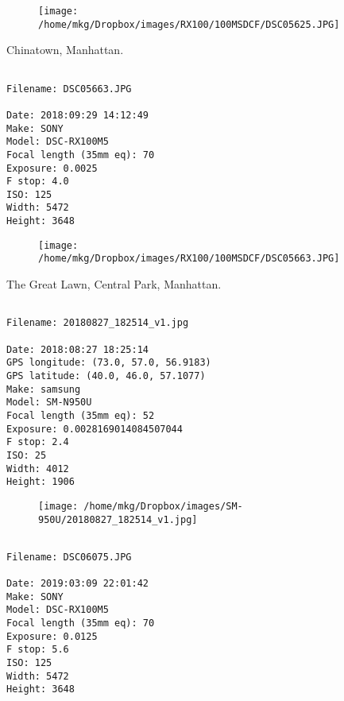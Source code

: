 \begin{figure}
\texttt{[image: /home/mkg/Dropbox/images/RX100/100MSDCF/DSC05625.JPG]}
\end{figure}
    
\clearpage
\onecolumn
\noindent Chinatown, Manhattan.
\noindent
\begin{lstlisting}

Filename: DSC05663.JPG

Date: 2018:09:29 14:12:49
Make: SONY
Model: DSC-RX100M5
Focal length (35mm eq): 70
Exposure: 0.0025
F stop: 4.0
ISO: 125
Width: 5472
Height: 3648
\end{lstlisting}
\clearpage

\begin{figure}
\texttt{[image: /home/mkg/Dropbox/images/RX100/100MSDCF/DSC05663.JPG]}
\end{figure}
    
\clearpage
\onecolumn
\noindent The Great Lawn, Central Park, Manhattan.
\noindent
\begin{lstlisting}

Filename: 20180827_182514_v1.jpg

Date: 2018:08:27 18:25:14
GPS longitude: (73.0, 57.0, 56.9183)
GPS latitude: (40.0, 46.0, 57.1077)
Make: samsung
Model: SM-N950U
Focal length (35mm eq): 52
Exposure: 0.0028169014084507044
F stop: 2.4
ISO: 25
Width: 4012
Height: 1906
\end{lstlisting}
\clearpage

\begin{figure}
\texttt{[image: /home/mkg/Dropbox/images/SM-950U/20180827\_182514\_v1.jpg]}
\end{figure}
    
\clearpage
\onecolumn
\noindent 
\noindent
\begin{lstlisting}

Filename: DSC06075.JPG

Date: 2019:03:09 22:01:42
Make: SONY
Model: DSC-RX100M5
Focal length (35mm eq): 70
Exposure: 0.0125
F stop: 5.6
ISO: 125
Width: 5472
Height: 3648
\end{lstlisting}
\clearpage

